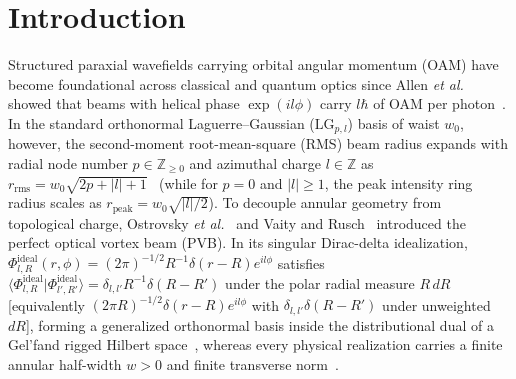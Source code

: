 \documentclass[aps,pra,reprint,nofootinbib,floatfix,longbibliography]{revtex4-2}
\theoremstyle{remark}
\newcommand{\braket}[2]{\langle #1 | #2 \rangle}
\newcommand{\abs}[1]{\lvert #1 \rvert}
\begin{document}
\maketitle

\section{Introduction}
\label{sec:intro}

Structured paraxial wavefields carrying orbital angular momentum (OAM) have become foundational across classical and quantum optics since Allen \emph{et al.} showed that beams with helical phase $\exp(il\phi)$ carry $l\hbar$ of OAM per photon~\cite{Allen1992,Siegman1986,Padgett2011,Erhard2018}. In the standard orthonormal Laguerre--Gaussian ($\mathrm{LG}_{p,l}$) basis of waist $w_0$, however, the second-moment root-mean-square (RMS) beam radius expands with radial node number $p \in \mathbb{Z}_{\ge 0}$ and azimuthal charge $l \in \mathbb{Z}$ as $r_{\mathrm{rms}} = w_0\sqrt{2p+\abs{l}+1}$~\cite{Allen1992,Siegman1986} (while for $p = 0$ and $\abs{l} \ge 1$, the peak intensity ring radius scales as $r_{\mathrm{peak}} = w_0\sqrt{\abs{l}/2}$). To decouple annular geometry from topological charge, Ostrovsky \emph{et al.}~\cite{Ostrovsky2013} and Vaity and Rusch~\cite{Vaity2015} introduced the perfect optical vortex beam (PVB). In its singular Dirac-delta idealization, $\Phi_{l,R}^{\mathrm{ideal}}(r,\phi) = (2\pi)^{-1/2} R^{-1}\delta(r-R)e^{il\phi}$ satisfies $\braket{\Phi_{l,R}^{\mathrm{ideal}}}{\Phi_{l',R'}^{\mathrm{ideal}}} = \delta_{l,l'} R^{-1}\delta(R-R')$ under the polar radial measure $R\,dR$ [equivalently $(2\pi R)^{-1/2}\delta(r-R)e^{il\phi}$ with $\delta_{l,l'}\delta(R-R')$ under unweighted $dR$], forming a generalized orthonormal basis inside the distributional dual of a Gel'fand rigged Hilbert space~\cite{Gelfand1964}, whereas every physical realization carries a finite annular half-width $w > 0$ and finite transverse norm~\cite{Vaity2015,Reddy2016}.
\end{document}
